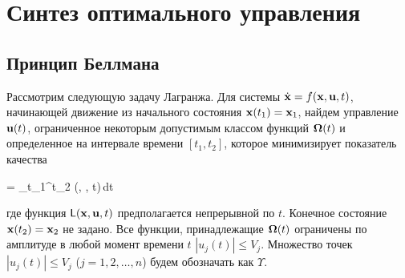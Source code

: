 


\chapter{Синтез оптимального управления}
\renewcommand{\funcF}{ \calf{F}           } %
\renewcommand{\optF}{  \optimum{\funcF}   } %
\newcommand{\optU}{    {\optimum{\m{u}}}  } %
\newcommand{\optX}{    {\optimum{\m{x}}}  } %
\newcommand{\funcL}{   \sff{L}            } %
\newcommand{\funcT}{   \optimum{\sff{F}}  } %
\newcommand{\funcV}{   \sff{V}            } %
\newcommand{\funcH}{   \optimum{H}        } %

\newcommand{\setS}{    \cale{S}           } %
\newcommand{\setV}{    \cale{V}           } %




\section{Принцип Беллмана}



Рассмотрим следующую задачу Лагранжа. Для системы $\dot{\mathbf{x}} = f(\mathbf{x}, \mathbf{u}, t)$, начинающей движение из начального состояния $\mathbf{x}(t_1) = \mathbf{x}_1$, найдем управление $\mathbf{u}(t)$, ограниченное некоторым допустимым классом функций $\mathbf{\Omega}(t)$ и определенное на интервале времени $[t_1, t_2]$, которое минимизирует показатель качества

    \funcF = \int\limits_{t_1}^{t_2} \funcL(, , t)\,dt \text{,}
\eeq

где функция $\funcL(\m{x}, \m{u}, t)$ предполагается непрерывной по $t$. Конечное состояние $\mathbf{x}(t_2) = \mathbf{x}_2$ не задано. Все функции, принадлежащие $\mathbf{\Omega}(t)$ ограничены по амплитуде в любой момент времени $t$ $|u_j(t)| \leqslant V_j$. Множество точек $|u_j(t)| \leqslant V_j$ ($j = 1, 2, \ldots, n$) будем обозначать как $\Upsilon$.

